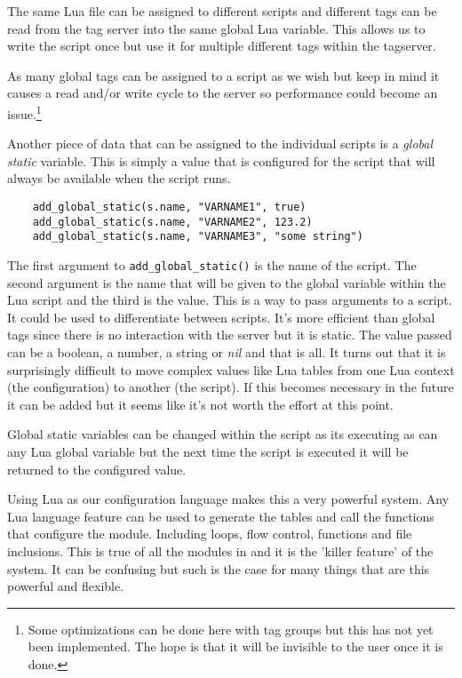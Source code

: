 The same Lua file can be assigned to different scripts and different tags can be read from the
tag server into the same global Lua variable.  This allows us to write the script once but use
it for multiple different tags within the tagserver.

As many global tags can be assigned to a script as we wish but keep in mind it causes a read and/or
write cycle to the server so performance could become an issue.\footnote{Some optimizations can be done
here with tag groups but this has not yet been implemented.  The hope is that it will be invisible
to the user once it is done.}

Another piece of data that can be assigned to the individual scripts is a \textit{global static}
variable.  This is simply a value that is configured for the script that will always be
available when the script runs.

\begin{verbatim}
	add_global_static(s.name, "VARNAME1", true)
	add_global_static(s.name, "VARNAME2", 123.2)
	add_global_static(s.name, "VARNAME3", "some string")
\end{verbatim}

The first argument to \texttt{add\_global\_static()} is the name of the script.  The second
argument is the name that will be given to the global variable within the Lua script and
the third is the value.  This is a way to pass arguments to a script.  It could be used
to differentiate between scripts.  It's more efficient than global tags since there is no
interaction with the server but it is static.  The value passed can be a boolean, a number,
a string or \textit{nil} and that is all.  It turns out that it is surprisingly difficult
to move complex values like Lua tables from one Lua context (the configuration) to another
(the script).  If this becomes necessary in the future it can be added but it seems like it's
not worth the effort at this point.

Global static variables can be changed within the script as its executing as can any Lua
global variable but the next time the script is executed it will be returned to the
configured value.

Using Lua as our configuration language makes this a very powerful system.  Any Lua language
feature can be used to generate the tables and call the functions that configure the module.
Including loops, flow control, functions and file inclusions.
This is true of all the modules in \opendax and it is the 'killer feature' of
the system.  It can be confusing but such is the case for many things that are this powerful
and flexible.

